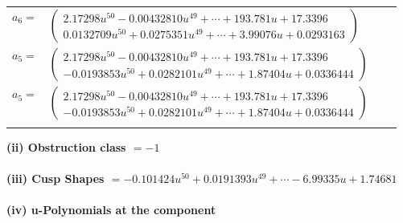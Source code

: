 \documentclass[1p]{elsarticle_modified}
\theoremstyle{definition}
\begin{document}
\begin{tabular}{m{7pt} m{180pt} m{7pt} m{180pt} }
\flushright $a_{6}=$&$\begin{pmatrix}2.17298 u^{50}-0.00432810 u^{49}+\cdots+193.781 u+17.3396\\0.0132709 u^{50}+0.0275351 u^{49}+\cdots+3.99076 u+0.0293163\end{pmatrix}$ \\
\flushright $a_{5}=$&$\begin{pmatrix}2.17298 u^{50}-0.00432810 u^{49}+\cdots+193.781 u+17.3396\\-0.0193853 u^{50}+0.0282101 u^{49}+\cdots+1.87404 u+0.0336444\end{pmatrix}$\\ \flushright $a_{5}=$&$\begin{pmatrix}2.17298 u^{50}-0.00432810 u^{49}+\cdots+193.781 u+17.3396\\-0.0193853 u^{50}+0.0282101 u^{49}+\cdots+1.87404 u+0.0336444\end{pmatrix}$\\&\end{tabular}
\flushleft \textbf{(ii) Obstruction class $= -1$}\\~\\
\flushleft \textbf{(iii) Cusp Shapes $= -0.101424 u^{50}+0.0191393 u^{49}+\cdots-6.99335 u+1.74681$}\\~\\
\newpage\renewcommand{\arraystretch}{1}
\flushleft \textbf{(iv) u-Polynomials at the component}\newline \\
\end{document}
